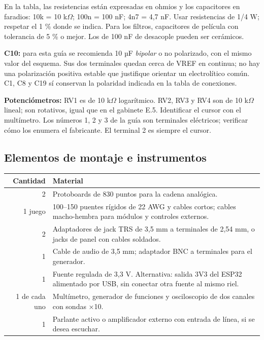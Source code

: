 \documentclass[10pt,a4paper]{article}
\begin{document}
En la tabla, las resistencias están expresadas en ohmios y los capacitores en faradios: 10k = 10 k\ensuremath{\Omega}; 100n = 100 nF; 4n7 = 4,7 nF. Usar resistencias de 1/4 W; respetar el 1 \% donde se indica. Para los filtros, capacitores de película con tolerancia de 5 \% o mejor. Los de 100 nF de desacople pueden ser cerámicos.
{\small}

\textbf{C10:} para esta guía se recomienda 10 µF \emph{bipolar} o no polarizado, con el mismo valor del esquema. Sus dos terminales quedan cerca de VREF en continua; no hay una polarización positiva estable que justifique orientar un electrolítico común. C1, C8 y C19 sí conservan la polaridad indicada en la tabla de conexiones.

\textbf{Potenciómetros:} RV1 es de 10 k\ensuremath{\Omega} logarítmico. RV2, RV3 y RV4 son de 10 k\ensuremath{\Omega} lineal; son rotativos, igual que en el gabinete E.5. Identificar el cursor con el multímetro. Los números 1, 2 y 3 de la guía son terminales eléctricos; verificar cómo los enumera el fabricante. El terminal 2 es siempre el cursor.

\subsection{Elementos de montaje e instrumentos}
\begin{tabularx}{\linewidth}{r X}\toprule
Cantidad & Material\\\midrule
2 & Protoboards de 830 puntos para la cadena analógica.\\
1 juego & 100--150 puentes rígidos de 22 AWG y cables cortos; cables macho-hembra para módulos y controles externos.\\
2 & Adaptadores de jack TRS de 3,5 mm a terminales de 2,54 mm, o jacks de panel con cables soldados.\\
1 & Cable de audio de 3,5 mm; adaptador BNC a terminales para el generador.\\
1 & Fuente regulada de 3,3 V. Alternativa: salida 3V3 del ESP32 alimentado por USB, sin conectar otra fuente al mismo riel.\\
1 de cada uno & Multímetro, generador de funciones y osciloscopio de dos canales con sondas ×10.\\
1 & Parlante activo o amplificador externo con entrada de línea, si se desea escuchar.\\\bottomrule
\end{tabularx}
\end{document}
